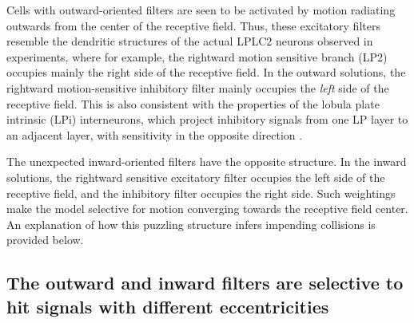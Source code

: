 \documentclass[pdftex,9pt,lineno]{elife}
\begin{document}
Cells with outward-oriented filters are seen to be activated by motion radiating outwards from the center of the receptive field. Thus, these excitatory filters resemble the dendritic structures of the actual LPLC2 neurons observed in experiments, where for example, the rightward motion sensitive branch (LP2) occupies mainly the right side of the receptive field. In the outward solutions, the rightward motion-sensitive inhibitory filter mainly occupies the \textit{left} side of the receptive field. This is also consistent with the properties of the lobula plate intrinsic (LPi) interneurons, which project inhibitory signals from one LP layer to an adjacent layer, with sensitivity in the opposite direction \citep{mauss2015neural,klapoetke2017ultra}.

The unexpected inward-oriented filters have the opposite structure. In the inward solutions, the rightward sensitive excitatory filter occupies the left side of the receptive field, and the inhibitory filter occupies the right side. Such weightings make the model selective for motion converging towards the receptive field center. An explanation of
how this puzzling structure infers impending collisions is provided below.

\subsection{The outward and inward filters are selective to hit signals with different eccentricities}




\end{document}
